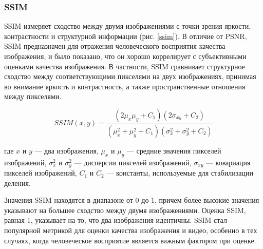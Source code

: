 \subsubsection{SSIM}\label{sect-1-3-2}

SSIM измеряет сходство между двумя изображениями с точки зрения яркости, контрастности и структурной информации (рис. \ref{ssim}). В отличие от PSNR, SSIM предназначен для отражения человеческого восприятия качества изображения, и было показано, что он хорошо коррелирует с субъективными оценками качества изображения. В частности, SSIM сравнивает структурное сходство между соответствующими пикселями на двух изображениях, принимая во внимание яркость и контрастность, а также пространственные отношения между пикселями.

\begin{equation}
    \label{eq:1-3-2}
    SSIM(x,y) = \frac{(2\mu_x\mu_y + C_1)(2\sigma_{xy} + C_2)}{(\mu_x^2 + \mu_y^2 + C_1)(\sigma_x^2 + \sigma_y^2 + C_2)}
\end{equation}

где $x$ и $y$ — два изображения, $\mu_x$ и $\mu_y$ — средние значения пикселей изображений, $\sigma_x^2$ и $\sigma_y^2$ — дисперсии пикселей изображений, $\sigma_{xy}$ — ковариация пикселей изображений, $C_1$ и $C_2$ — константы, используемые для стабилизации деления.


Значения SSIM находятся в диапазоне от 0 до 1, причем более высокие значения указывают на большее сходство между двумя изображениями. Оценка SSIM, равная 1, указывает на то, что два изображения идентичны. SSIM стал популярной метрикой для оценки качества изображения и видео, особенно в тех случаях, когда человеческое восприятие является важным фактором при оценке.

